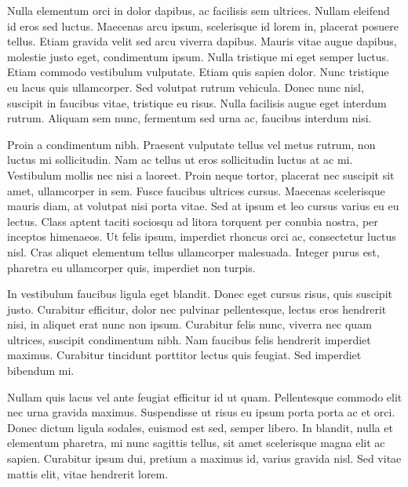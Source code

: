 Nulla elementum orci in dolor dapibus, ac facilisis sem ultrices. Nullam eleifend id eros sed luctus. Maecenas arcu ipsum, scelerisque id lorem in, placerat posuere tellus. Etiam gravida velit sed arcu viverra dapibus. Mauris vitae augue dapibus, molestie justo eget, condimentum ipsum. Nulla tristique mi eget semper luctus. Etiam commodo vestibulum vulputate. Etiam quis sapien dolor. Nunc tristique eu lacus quis ullamcorper. Sed volutpat rutrum vehicula. Donec nunc nisl, suscipit in faucibus vitae, tristique eu risus. Nulla facilisis augue eget interdum rutrum. Aliquam sem nunc, fermentum sed urna ac, faucibus interdum nisi.

Proin a condimentum nibh. Praesent vulputate tellus vel metus rutrum, non luctus mi sollicitudin. Nam ac tellus ut eros sollicitudin luctus at ac mi. Vestibulum mollis nec nisi a laoreet. Proin neque tortor, placerat nec suscipit sit amet, ullamcorper in sem. Fusce faucibus ultrices cursus. Maecenas scelerisque mauris diam, at volutpat nisi porta vitae. Sed at ipsum et leo cursus varius eu eu lectus. Class aptent taciti sociosqu ad litora torquent per conubia nostra, per inceptos himenaeos. Ut felis ipsum, imperdiet rhoncus orci ac, consectetur luctus nisl. Cras aliquet elementum tellus ullamcorper malesuada. Integer purus est, pharetra eu ullamcorper quis, imperdiet non turpis.

In vestibulum faucibus ligula eget blandit. Donec eget cursus risus, quis suscipit justo. Curabitur efficitur, dolor nec pulvinar pellentesque, lectus eros hendrerit nisi, in aliquet erat nunc non ipsum. Curabitur felis nunc, viverra nec quam ultrices, suscipit condimentum nibh. Nam faucibus felis hendrerit imperdiet maximus. Curabitur tincidunt porttitor lectus quis feugiat. Sed imperdiet bibendum mi.

Nullam quis lacus vel ante feugiat efficitur id ut quam. Pellentesque commodo elit nec urna gravida maximus. Suspendisse ut risus eu ipsum porta porta ac et orci. Donec dictum ligula sodales, euismod est sed, semper libero. In blandit, nulla et elementum pharetra, mi nunc sagittis tellus, sit amet scelerisque magna elit ac sapien. Curabitur ipsum dui, pretium a maximus id, varius gravida nisl. Sed vitae mattis elit, vitae hendrerit lorem. 

